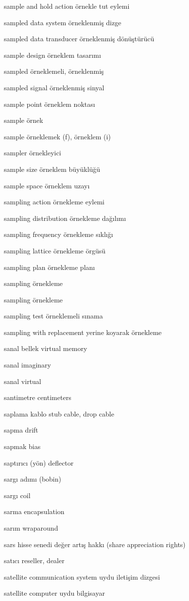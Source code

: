 \documentclass[12pt,fleqn]{article}\usepackage{../../common}
\begin{document}
sample and hold action örnekle tut eylemi

sampled data system örneklenmiş dizge

sampled data transducer örneklenmiş dönüştürücü

sample design örneklem tasarımı

sampled örneklemeli, örneklenmiş

sampled signal örneklenmiş sinyal

sample point örneklem noktası

sample örnek

sample örneklemek (f), örneklem (i)

sampler örnekleyici

sample size örneklem büyüklüğü

sample space örneklem uzayı

sampling action örnekleme eylemi

sampling distribution örnekleme dağılımı

sampling frequency örnekleme sıklığı

sampling lattice örnekleme örgüsü

sampling plan örnekleme planı

sampling örnekleme

sampling örnekleme

sampling test örneklemeli sınama

sampling with replacement yerine koyarak örnekleme

sanal bellek virtual memory

sanal imaginary

sanal virtual

santimetre centimeters

saplama kablo stub cable, drop cable

sapma drift

sapmak bias

saptırıcı (yön) deflector

sargı adımı (bobin)

sargı coil

sarma encapsulation

sarım wraparound

sars hisse senedi değer artış hakkı (share appreciation rights)

satıcı reseller, dealer

satellite communication system uydu iletişim dizgesi

satellite computer uydu bilgisayar
\end{document}

